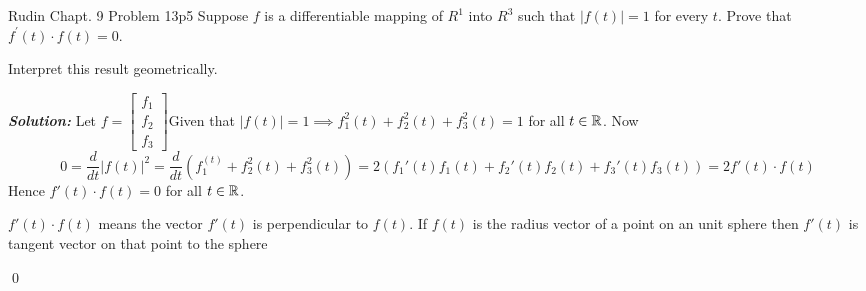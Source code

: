 \documentclass[a4paper, 11pt]{article}
\newcommand{\Qed}{\begin{flushright}\qed\end{flushright}}
\newcommand{\sol}[1]{\begin{solution}#1\end{solution}\Qed}
\newcommand{\parinn}{\setlength{\parindent}{1cm}}
\newenvironment{solution}
{\textbf{\textit{Solution: }}\setlength{\parindent}{1cm}}
{}
\begin{document}
	
	
	\begin{problem}{Rudin Chapt. 9 Problem 13}{p5%
		}
		Suppose $f$ is a differentiable mapping of $R^{1}$ into $R^{3}$ such that $|f(t)|=1$ for every $t$. Prove that $f^{\prime}(t) \cdot f(t)=0$.\parinn
		
		Interpret this result geometrically.
	\end{problem}
	
	\sol{Let $f=\begin{bmatrix}
			f_1\\ f_2\\ f_3
		\end{bmatrix}$Given that $|f(t)|=1\implies f_1^2(t)+f_2^2(t)+f_3^2(t)=1$ for all $t\in \mathbb{R}$. Now $$0=\frac{d}{dt}|f(t)|^2=\frac{d}{dt}(f_1^(t)+f_2^2(t)+f_3^2(t))=2(f_1'(t)f_1(t)+f_2'(t)f_2(t)+f_3'(t)f_3(t))=2f'(t)\cdot f(t)$$Hence $f'(t)\cdot f(t)=0$ for all $t\in \mathbb{R}$.
	
	$f'(t)\cdot f(t)$ means the vector $f'(t)$ is perpendicular to $f(t)$. If $f(t)$ is the radius vector of a point on an unit sphere then $f'(t)$ is tangent vector on that point to the sphere
}
	
\end{document}
